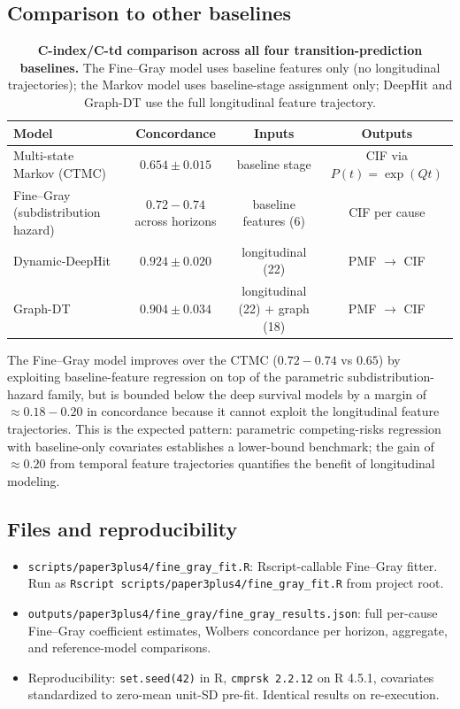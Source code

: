\documentclass[11pt]{article}
\begin{document}
\subsection*{Comparison to other baselines}

\begin{table}[h!]
\centering
\caption{\textbf{C-index/C-td comparison across all four transition-prediction baselines.} The Fine--Gray model uses baseline features only (no longitudinal trajectories); the Markov model uses baseline-stage assignment only; DeepHit and Graph-DT use the full longitudinal feature trajectory.}
\label{tab:s_wsp37c_baselines}
\begin{tabular}{lccc}
\toprule
\textbf{Model} & \textbf{Concordance} & \textbf{Inputs} & \textbf{Outputs} \\
\midrule
Multi-state Markov (CTMC)            & $0.654 \pm 0.015$    & baseline stage     & CIF via $P(t)=\exp(Qt)$  \\
Fine--Gray (subdistribution hazard)  & $0.72{-}0.74$ across horizons & baseline features (6) & CIF per cause \\
Dynamic-DeepHit                      & $0.924 \pm 0.020$    & longitudinal (22)  & PMF $\to$ CIF \\
Graph-DT                             & $0.904 \pm 0.034$    & longitudinal (22) + graph (18) & PMF $\to$ CIF \\
\bottomrule
\end{tabular}
\end{table}

\noindent The Fine--Gray model improves over the CTMC ($0.72{-}0.74$ vs $0.65$) by exploiting baseline-feature regression on top of the parametric subdistribution-hazard family, but is bounded below the deep survival models by a margin of $\approx 0.18{-}0.20$ in concordance because it cannot exploit the longitudinal feature trajectories. This is the expected pattern: parametric competing-risks regression with baseline-only covariates establishes a lower-bound benchmark; the gain of $\approx 0.20$ from temporal feature trajectories quantifies the benefit of longitudinal modeling.

\subsection*{Files and reproducibility}

\begin{itemize}\itemsep=0.2em
  \item \texttt{scripts/paper3plus4/fine\_gray\_fit.R}: Rscript-callable Fine--Gray fitter. Run as \texttt{Rscript scripts/paper3plus4/fine\_gray\_fit.R} from project root.
  \item \texttt{outputs/paper3plus4/fine\_gray/fine\_gray\_results.json}: full per-cause Fine--Gray coefficient estimates, Wolbers concordance per horizon, aggregate, and reference-model comparisons.
  \item Reproducibility: \texttt{set.seed(42)} in R, \texttt{cmprsk 2.2.12} on R 4.5.1, covariates standardized to zero-mean unit-SD pre-fit. Identical results on re-execution.
\end{itemize}
\end{document}
